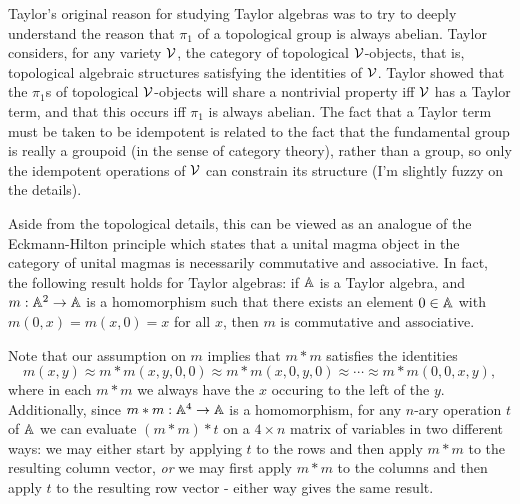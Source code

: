 \documentclass[letterpaper,11pt]{article}
\begin{document}
\begin{rem}\label{gen-eckmann-hilton} Taylor's original reason for studying Taylor algebras was to try to deeply understand the reason that $\pi_1$ of a topological group is always abelian. Taylor \cite{taylor-varieties} considers, for any variety $\mathcal{V}$, the category of topological $\mathcal{V}$-objects, that is, topological algebraic structures satisfying the identities of $\mathcal{V}$. Taylor showed that the $\pi_1$s of topological $\mathcal{V}$-objects will share a nontrivial property iff $\mathcal{V}$ has a Taylor term, and that this occurs iff $\pi_1$ is always abelian. The fact that a Taylor term must be taken to be idempotent is related to the fact that the fundamental group is really a groupoid (in the sense of category theory), rather than a group, so only the idempotent operations of $\mathcal{V}$ can constrain its structure (I'm slightly fuzzy on the details).

Aside from the topological details, this can be viewed as an analogue of the Eckmann-Hilton principle \cite{eckmann-hilton} which states that a unital magma object in the category of unital magmas is necessarily commutative and associative. In fact, the following result holds for Taylor algebras: if $\mathbb{A}$ is a Taylor algebra, and $m : \mathbb{A}^2 \rightarrow \mathbb{A}$ is a homomorphism such that there exists an element $0 \in \mathbb{A}$ with $m(0,x) = m(x,0) = x$ for all $x$, then $m$ is commutative and associative.

Note that our assumption on $m$ implies that $m*m$ satisfies the identities
\[
m(x,y) \approx m*m(x,y,0,0) \approx m*m(x,0,y,0) \approx \cdots \approx m*m(0,0,x,y),
\]
where in each $m*m$ we always have the $x$ occuring to the left of the $y$. Additionally, since $m*m : \mathbb{A}^4 \rightarrow \mathbb{A}$ is a homomorphism, for any $n$-ary operation $t$ of $\mathbb{A}$ we can evaluate $(m*m)*t$ on a $4\times n$ matrix of variables in two different ways: we may either start by applying $t$ to the rows and then apply $m*m$ to the resulting column vector, \emph{or} we may first apply $m*m$ to the columns and then apply $t$ to the resulting row vector - either way gives the same result.


\end{rem}
\end{document}
